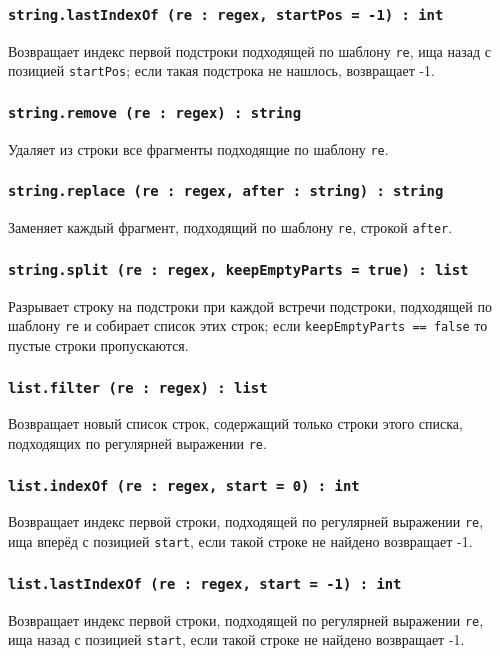 \subsubsection{\texttt{string.lastIndexOf (re : regex, startPos = -1) : int}}

Возвращает индекс первой подстроки подходящей по шаблону \texttt{re}, ища назад с позицией \texttt{startPos}; если такая подстрока не нашлось, возвращает -1.

\subsubsection{\texttt{string.remove (re : regex) : string}}

Удаляет из строки все фрагменты подходящие по шаблону \texttt{re}.

\subsubsection{\texttt{string.replace (re : regex, after : string) : string}}

Заменяет каждый фрагмент, подходящий по шаблону \texttt{re}, строкой \texttt{after}.

\subsubsection{\texttt{string.split (re : regex, keepEmptyParts = true) : list}}

Разрывает строку на подстроки при каждой встречи подстроки, подходящей по шаблону \texttt{re} и собирает список этих строк; если \texttt{keepEmptyParts == false} то пустые строки пропускаются.

\subsubsection{\texttt{list.filter (re : regex) : list}}

Возвращает новый список строк, содержащий только строки этого списка, подходящих по регулярней выражении \texttt{re}.

\subsubsection{\texttt{list.indexOf (re : regex, start = 0) : int}}

Возвращает индекс первой строки, подходящей по регулярней выражении \texttt{re}, ища вперёд с позицией \texttt{start}, если такой строке не найдено возвращает -1.

\subsubsection{\texttt{list.lastIndexOf (re : regex, start = -1) : int}}

Возвращает индекс первой строки, подходящей по регулярней выражении \texttt{re}, ища назад с позицией \texttt{start}, если такой строке не найдено возвращает -1.


